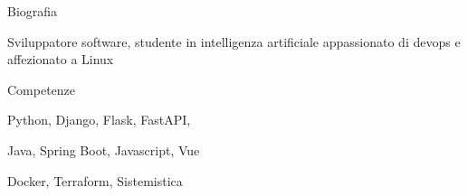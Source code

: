\documentclass{cv} %
\def\sidespacing{0.5cm}
\begin{document}
\begin{minipage}[b][0.9\paperheight][t]{0.29\linewidth}

    \begin{minipage}[c]{\linewidth}
        \centering
    \end{minipage}

    \vspace{\sidespacing}

    \begin{rSection}{Biografia}
        \item Sviluppatore software, studente in intelligenza artificiale
        appassionato di devops
        e affezionato a Linux
    \end{rSection}

    \vspace{\sidespacing}

    \begin{rSection}{Competenze}
        \item Python, Django, Flask, FastAPI,
        \item Java, Spring Boot, Javascript, Vue
        \item Docker, Terraform, Sistemistica
    \end{rSection}


\end{minipage}
\end{document}
